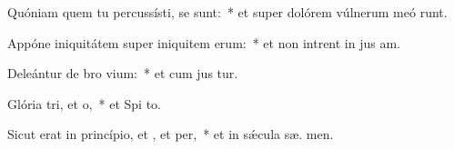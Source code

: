 \item Quóniam quem tu percussísti, se sunt:~* et super dolórem vúlnerum meó runt.
\item Appóne iniquitátem super iniquitem erum:~* et non intrent in jus am.
\item Deleántur de bro vium:~* et cum jus  tur.
\item Glória tri, et o,~* et Spi to.
\item Sicut erat in princípio, et , et per,~* et in sǽcula sæ. men.
